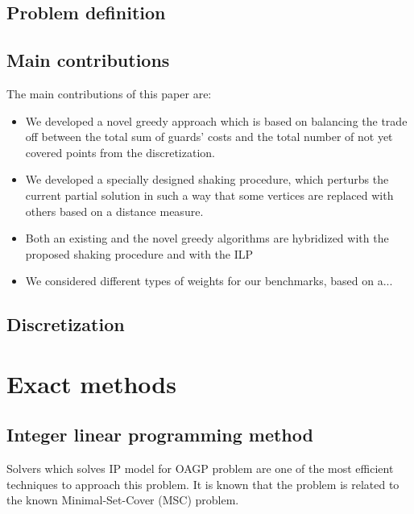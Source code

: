 \documentclass[runningheads,a4paper]{elsarticle}
\begin{document}
\subsection{Problem definition}


\subsection{Main contributions}
The main contributions of this paper are:
\begin{itemize}
\item We developed a novel greedy approach which is based on balancing the trade off between the total sum of guards' costs and the total number of not yet covered points from the discretization.
\item We developed a specially designed shaking procedure, which perturbs the current partial solution in such a way that some vertices are replaced with others based on a distance measure.
\item Both an existing and the novel greedy algorithms are hybridized with the proposed shaking procedure and with the ILP
\item We considered different types of weights for our benchmarks, based on a... 
\end{itemize}


     \subsection{Discretization}  

     \section{Exact methods}
     \subsection{Integer linear programming method}
     Solvers which solves IP model for OAGP problem are one of the most efficient techniques to approach this problem. It is known that the problem is related to the known Minimal-Set-Cover (MSC) problem.
\end{document}
